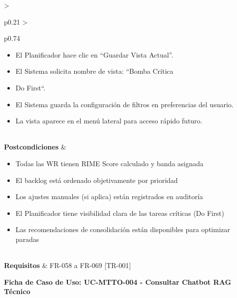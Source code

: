 \begin{longtable}{>{\raggedright\arraybackslash}p{0.21\textwidth} >{\raggedright\arraybackslash}p{0.74\textwidth}}
{\begin{enumerate}[leftmargin=1.5em, nosep, topsep=0pt]
\begin{itemize}[leftmargin=1.2em, nosep, topsep=0pt]
\item El Planificador hace clic en ``Guardar Vista Actual''.
\item El Sistema solicita nombre de vista: ``Bomba Crítica
\item Do First``.
\item El Sistema guarda la configuración de filtros en preferencias del usuario.
\item La vista aparece en el menú lateral para acceso rápido futuro.
\end{itemize}
\end{enumerate} \vspace{2pt}} \\
\textbf{Postcondiciones} & \parbox[t]{\linewidth}{\vspace{2pt} \begin{itemize}[leftmargin=1.5em, nosep, topsep=0pt]
\item Todas las WR tienen RIME Score calculado y banda asignada
\item El backlog está ordenado objetivamente por prioridad
\item Los ajustes manuales (si aplica) están registrados en auditoría
\item El Planificador tiene visibilidad clara de las tareas críticas (Do First)
\item Las recomendaciones de consolidación están disponibles para optimizar paradas
\end{itemize} \vspace{2pt}} \\
\textbf{Requisitos} & FR-058 a FR-069 [TR-001] \\ \bottomrule
\end{longtable}\normalsize\vspace{1em}
\noindent\textbf{Ficha de Caso de Uso: UC-MTTO-004 - Consultar Chatbot RAG Técnico}
\footnotesize\setlength{\tabcolsep}{4pt}\renewcommand{\arraystretch}{1.2}
